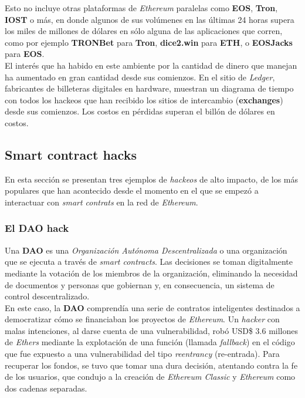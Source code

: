 Esto no incluye otras plataformas de \textit{Ethereum} paralelas como \textbf{EOS}, \textbf{Tron}, \textbf{IOST} o más, en donde algunos de sus volúmenes en las últimas 24 horas supera los miles de millones de dólares en sólo alguna de las aplicaciones que corren, como por ejemplo \textbf{TRONBet} para \textbf{Tron}, \textbf{dice2.win} para \textbf{ETH}, o \textbf{EOSJacks} para \textbf{EOS}\cite{dappradar}.\\

El interés que ha habido en este ambiente por la cantidad de dinero que manejan ha aumentado en gran cantidad desde sus comienzos. En el sitio de \textit{Ledger}, fabricantes de billeteras digitales en hardware, muestran un diagrama de tiempo\cite{ledgerhackstime} con todos los hackeos que han recibido los sitios de intercambio (\textbf{exchanges}) desde sus comienzos. Los costos en pérdidas superan el billón de dólares en costos.

\subsection{Smart contract hacks}
En esta sección se presentan tres ejemplos de \textit{hackeos} de alto impacto, de los más populares que han acontecido desde el momento en el que se empezó a interactuar con \textit{smart contrats} en la red de \textit{Ethereum}.


\subsubsection{El DAO hack}
Una \textbf{DAO} es una \textit{Organización Autónoma Descentralizada} o una organización que se ejecuta a través de \textit{smart contracts}. Las decisiones se toman digitalmente mediante la votación de los miembros de la organización, eliminando la necesidad de documentos y personas que gobiernan y, en consecuencia, un sistema de control descentralizado.\\

En este caso, la \textbf{DAO} comprendía una serie de contratos inteligentes destinados a democratizar cómo se financiaban los proyectos de \textit{Ethereum}. Un \textit{hacker} con malas intenciones, al darse cuenta de una vulnerabilidad, robó USD\$ 3.6 millones de \textit{Ethers} mediante la explotación de una función (llamada \textit{fallback}) en el código que fue expuesto a una vulnerabilidad del tipo \textit{reentrancy} (re-entrada). Para recuperar los fondos, se tuvo que tomar una dura decisión, atentando contra la fe de los usuarios, que condujo a la creación de \textit{Ethereum Classic} y \textit{Ethereum} como dos cadenas separadas.\cite{daoattack}


